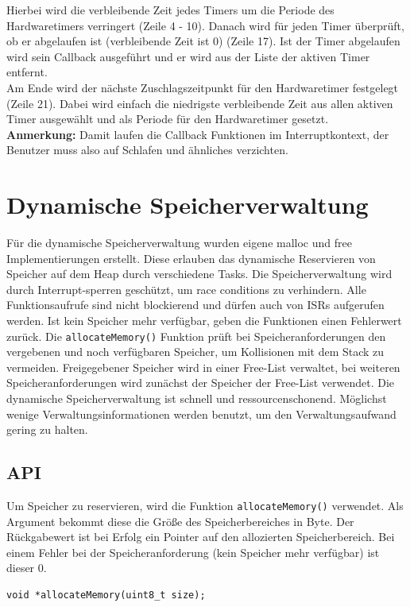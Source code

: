 \documentclass[fontsize=12pt, toc=bibliography, notitlepage]{scrreprt}
\begin{document}
Hierbei wird die verbleibende Zeit jedes Timers um die Periode des Hardwaretimers verringert (Zeile 4 - 10). Danach wird für jeden Timer überprüft, ob er abgelaufen ist (verbleibende Zeit ist 0) (Zeile 17). Ist der Timer abgelaufen wird sein Callback ausgeführt und er wird aus der Liste der aktiven Timer entfernt.\\
Am Ende wird der nächste Zuschlagszeitpunkt für den Hardwaretimer festgelegt (Zeile 21). Dabei wird einfach die niedrigste verbleibende Zeit aus allen aktiven Timer ausgewählt und als Periode für den Hardwaretimer gesetzt.\\
\textbf{Anmerkung:} Damit laufen die Callback Funktionen im Interruptkontext, der Benutzer muss also auf Schlafen und ähnliches verzichten.

\chapter{Dynamische Speicherverwaltung}
\label{chap:dynamische-speicherverwaltung}
Für die dynamische Speicherverwaltung wurden eigene malloc und free Implementierungen erstellt. Diese erlauben das dynamische Reservieren von Speicher auf dem Heap durch verschiedene Tasks. Die Speicherverwaltung wird durch Interrupt-sperren geschützt, um race conditions zu verhindern. Alle Funktionsaufrufe sind nicht blockierend und dürfen auch von ISRs aufgerufen werden. Ist kein Speicher mehr verfügbar, geben die Funktionen einen Fehlerwert zurück. Die \lstinline$allocateMemory()$ Funktion prüft bei Speicheranforderungen den vergebenen und noch verfügbaren Speicher, um Kollisionen mit dem Stack zu vermeiden. Freigegebener Speicher wird in einer Free-List verwaltet, bei weiteren Speicheranforderungen wird zunächst der Speicher der Free-List verwendet. Die dynamische Speicherverwaltung ist schnell und ressourcenschonend. Möglichst wenige Verwaltungsinformationen werden benutzt, um den Verwaltungsaufwand gering zu halten. 

\section{API}
\label{subsec:mem-api}
Um Speicher zu reservieren, wird die Funktion \lstinline$allocateMemory()$ verwendet. Als Argument bekommt diese die Größe des Speicherbereiches in Byte. Der Rückgabewert ist bei Erfolg ein Pointer auf den allozierten Speicherbereich. Bei einem Fehler bei der Speicheranforderung (kein Speicher mehr verfügbar) ist dieser 0.

\begin{lstlisting}[title=memory.h]
void *allocateMemory(uint8_t size);
\end{lstlisting}
\end{document}
